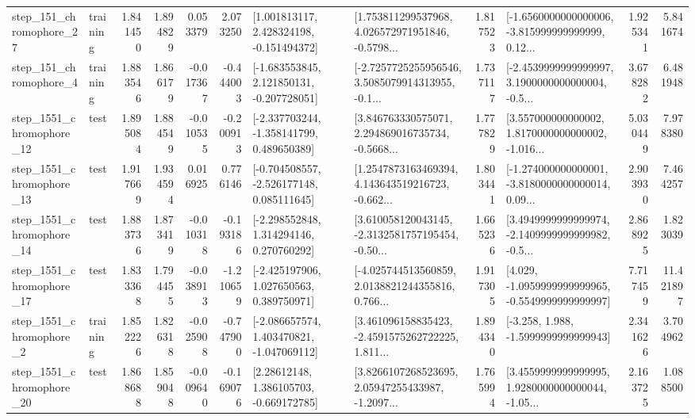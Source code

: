 \begin{tabular}{llrrrrllrlrr}
  step\_151\_chromophore\_27 &  training &      1.841450 &    1.894829 &      0.053379 &  2.073250 &    [1.001813117, 2.428324198, -0.151494372] &  [1.753811299537968, 4.026572971951846, -0.5798... &       1.817523 &  [-1.6560000000000006, -3.815999999999999, 0.12... &            1.925341 &          5.841674 \\
   step\_151\_chromophore\_4 &  training &      1.883546 &    1.866179 &     -0.017367 & -0.444003 &   [-1.683553845, 2.121850131, -0.207728051] &  [-2.7257725255956546, 3.5085079914313955, -0.1... &       1.737117 &  [-2.4539999999999997, 3.1900000000000004, -0.5... &            3.678282 &          6.481948 \\
 step\_1551\_chromophore\_12 &      test &      1.895084 &    1.884549 &     -0.010535 & -0.200913 &   [-2.337703244, -1.358141799, 0.489650389] &  [3.846763330575071, 2.294869016735734, -0.5668... &       1.777829 &  [3.557000000000002, 1.8170000000000002, -1.016... &            5.030449 &          7.978380 \\
 step\_1551\_chromophore\_13 &      test &      1.917669 &    1.934594 &      0.016925 &  0.776146 &   [-0.704508557, -2.526177148, 0.085111645] &  [1.2547873163469394, 4.143643519216723, -0.662... &       1.803441 &  [-1.274000000000001, -3.8180000000000014, 0.09... &            2.903930 &          7.464257 \\
 step\_1551\_chromophore\_14 &      test &      1.883736 &    1.873419 &     -0.010318 & -0.193186 &    [-2.298552848, 1.314294146, 0.270760292] &  [3.610058120043145, -2.3132581757195454, -0.50... &       1.665236 &  [3.4949999999999974, -2.1409999999999982, -0.5... &            2.868925 &          1.823039 \\
 step\_1551\_chromophore\_17 &      test &      1.833368 &    1.794455 &     -0.038913 & -1.210659 &    [-2.425197906, 1.027650563, 0.389750971] &  [-4.025744513560859, 2.0138821244355816, 0.766... &       1.917305 &  [4.029, -1.0959999999999965, -0.5549999999999997] &            7.717459 &         11.421897 \\
  step\_1551\_chromophore\_2 &  training &      1.852226 &    1.826318 &     -0.025908 & -0.747900 &   [-2.086657574, 1.403470821, -1.047069112] &  [3.461096158835423, -2.4591575262722225, 1.811... &       1.894340 &               [-3.258, 1.988, -1.5999999999999943] &            2.341626 &          3.704962 \\
 step\_1551\_chromophore\_20 &      test &      1.868688 &    1.859048 &     -0.009640 & -0.169076 &     [2.28612148, 1.386105703, -0.669172785] &  [3.8266107268523695, 2.05947255433987, -1.2097... &       1.765994 &  [3.4559999999999995, 1.9280000000000044, -1.05... &            2.163725 &          1.088500 \\

\end{tabular}
